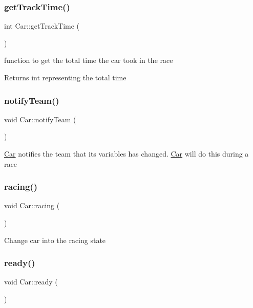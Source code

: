 \subsubsection{\texorpdfstring{get\+Track\+Time()}{getTrackTime()}}
{\footnotesize\ttfamily int Car\+::get\+Track\+Time (\begin{DoxyParamCaption}{ }\end{DoxyParamCaption})}

function to get the total time the car took in the race \begin{DoxyReturn}{Returns}
int representing the total time 
\end{DoxyReturn}
\mbox{\label{class_car_abbf050e461e2e56dae11e89c8efda7af}} 
\subsubsection{\texorpdfstring{notify\+Team()}{notifyTeam()}}
{\footnotesize\ttfamily void Car\+::notify\+Team (\begin{DoxyParamCaption}{ }\end{DoxyParamCaption})}

\mbox{\hyperlink{class_car}{Car}} notifies the team that its variables has changed. \mbox{\hyperlink{class_car}{Car}} will do this during a race \mbox{\label{class_car_a944100a25b1f6c67ca95e45868d9c10b}} 
\subsubsection{\texorpdfstring{racing()}{racing()}}
{\footnotesize\ttfamily void Car\+::racing (\begin{DoxyParamCaption}{ }\end{DoxyParamCaption})}

Change car into the racing state \mbox{\label{class_car_aa698269ee1300d5844decbe894c139c5}} 
\subsubsection{\texorpdfstring{ready()}{ready()}}
{\footnotesize\ttfamily void Car\+::ready (\begin{DoxyParamCaption}{ }\end{DoxyParamCaption})}

